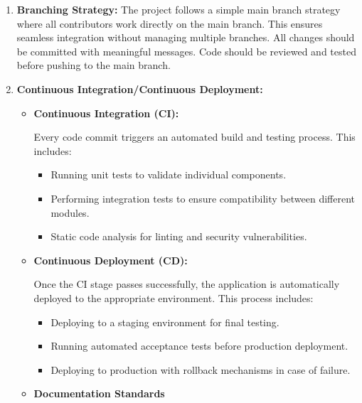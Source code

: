 \documentclass{llncs}
\begin{document}
\begin{enumerate}
    \item \textbf{Branching Strategy:} \newline
          The project follows a simple main branch strategy where all contributors work directly on the main branch.
          This ensures seamless integration without managing multiple branches. All changes should be committed with meaningful messages.
          Code should be reviewed and tested before pushing to the main branch.
\end{enumerate}

\begin{enumerate}
    \setcounter{enumi}{1}
    \item \textbf{Continuous Integration/Continuous Deployment:}
          \begin{itemize}
              \item \textbf{Continuous Integration (CI):}

                    Every code commit triggers an automated build and testing process. This includes:
                    \begin{itemize}
                        \item Running unit tests to validate individual components.
                        \item Performing integration tests to ensure compatibility between different modules.
                        \item Static code analysis for linting and security vulnerabilities.
                    \end{itemize}

                    \bigskip %
              \item \textbf{Continuous Deployment (CD):}

                    Once the CI stage passes successfully, the application is automatically deployed to the appropriate environment. This process includes:
                    \begin{itemize}
                        \item Deploying to a staging environment for final testing.
                        \item Running automated acceptance tests before production deployment.
                        \item Deploying to production with rollback mechanisms in case of failure.
                    \end{itemize}

                    \bigskip %

              \item \textbf{Documentation Standards}
          \end{itemize}
\end{enumerate}
\end{document}
